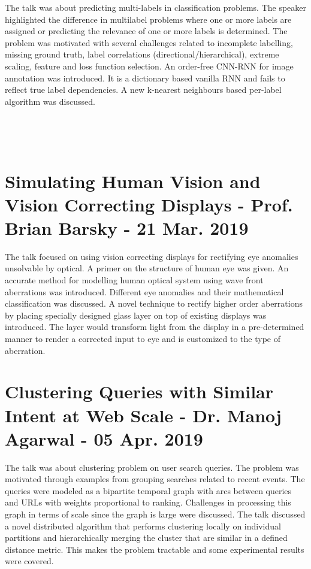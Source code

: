 \documentclass[11pt,a4paper,oneside]{article}
\begin{document}
	The talk was about predicting multi-labels in classification problems. The speaker highlighted the difference in multilabel problems where one or more labels are assigned or predicting the relevance of one or more labels is determined. The problem was motivated with several challenges related to incomplete labelling, missing ground truth, label correlations (directional/hierarchical), extreme scaling, feature and loss function selection. An order-free CNN-RNN for image annotation was introduced. It is a dictionary based vanilla RNN and fails to reflect true label dependencies. A new k-nearest neighbours based per-label algorithm was discussed.
	
	\pagebreak
	
	\begin{verbatim}
	
	
	
	\end{verbatim}
	
	\section{Simulating Human Vision and Vision Correcting Displays - Prof. Brian Barsky - 21 Mar. 2019}
	
	The talk focused on using vision correcting displays for rectifying eye anomalies unsolvable by optical. A primer on the structure of human eye was given. An accurate method for modelling human optical system using wave front aberrations was introduced. Different eye anomalies and their mathematical classification was discussed. A novel technique to rectify higher order aberrations by placing specially designed glass layer on top of existing displays was introduced. The layer would transform light from the display in a pre-determined manner to render a corrected input to eye and is customized to the type of aberration. 
	
	\section{Clustering Queries with Similar Intent at Web Scale - Dr. Manoj Agarwal - 05 Apr. 2019}
	
	The talk was about clustering problem on user search queries. The problem was motivated through examples from grouping searches related to recent events. The queries were modeled as a bipartite temporal graph with arcs between queries and URLs with weights proportional to ranking. Challenges in processing this graph in terms of scale since the graph is large were discussed. The talk discussed a novel distributed algorithm that performs clustering locally on individual partitions and hierarchically merging the cluster that are similar in a defined distance metric. This makes the problem tractable and some experimental results were covered.
		
\end{document}
